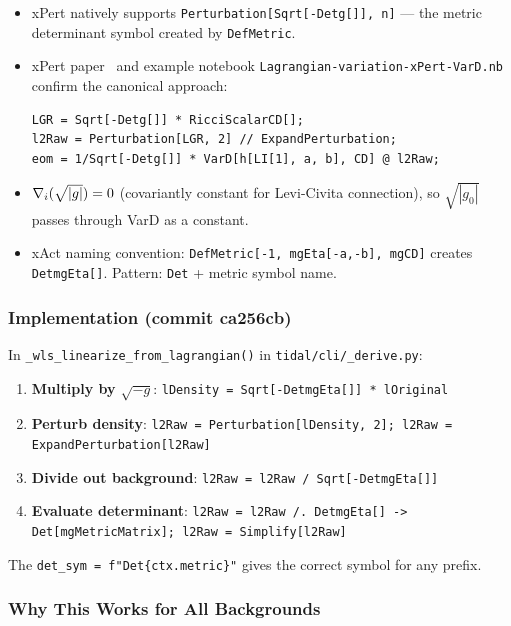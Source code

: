 \begin{itemize}
  \item xPert natively supports \texttt{Perturbation[Sqrt[-Detg[]], n]} --- the metric determinant symbol created by \texttt{DefMetric}.
  \item xPert paper~\cite{brizuela2009xpert} and example notebook \texttt{Lagrangian-variation-xPert-VarD.nb} confirm the canonical approach:

\begin{lstlisting}[style=mathematica]
LGR = Sqrt[-Detg[]] * RicciScalarCD[];
l2Raw = Perturbation[LGR, 2] // ExpandPerturbation;
eom = 1/Sqrt[-Detg[]] * VarD[h[LI[1], a, b], CD] @ l2Raw;
\end{lstlisting}

  \item $\nabla_i(\sqrt{|g|}) = 0$ (covariantly constant for Levi-Civita connection), so $\sqrt{|g_0|}$ passes through VarD as a constant.
  \item xAct naming convention: \texttt{DefMetric[-1, mgEta[-a,-b], mgCD]} creates \texttt{DetmgEta[]}. Pattern: \texttt{Det} + metric symbol name.
\end{itemize}

\subsubsection{Implementation (commit ca256cb)}

In \texttt{\_wls\_linearize\_from\_lagrangian()} in \texttt{tidal/cli/\_derive.py}:

\begin{enumerate}
  \item \textbf{Multiply by $\sqrt{-g}$}: \texttt{lDensity = Sqrt[-DetmgEta[]] * lOriginal}
  \item \textbf{Perturb density}: \texttt{l2Raw = Perturbation[lDensity, 2]; l2Raw = ExpandPerturbation[l2Raw]}
  \item \textbf{Divide out background}: \texttt{l2Raw = l2Raw / Sqrt[-DetmgEta[]]}
  \item \textbf{Evaluate determinant}: \texttt{l2Raw = l2Raw /. DetmgEta[] -> Det[mgMetricMatrix]; l2Raw = Simplify[l2Raw]}
\end{enumerate}

The \texttt{det\_sym = f"Det\{ctx.metric\}"} gives the correct symbol for any prefix.

\subsubsection{Why This Works for All Backgrounds}

